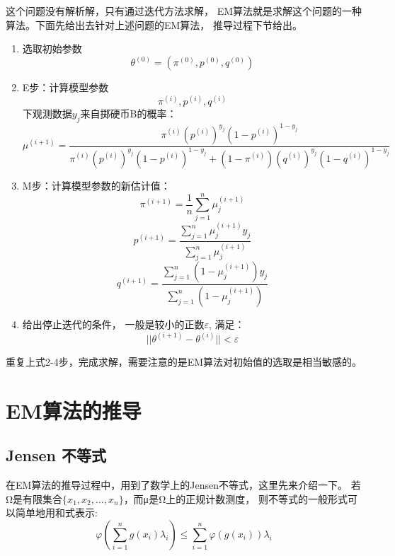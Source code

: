 \documentclass[a4paper,12pt]{book}
\begin{document}
    这个问题没有解析解，只有通过迭代方法求解，
    EM算法就是求解这个问题的一种算法。下面先给出去针对上述问题的EM算法，
    推导过程下节给出。
    \begin{enumerate}
        \item 选取初始参数 
        \begin{equation}
            \theta^{(0)} = (\pi^{(0)}, p^{(0)}, q^{(0)})
        \end{equation}
        \item E步：计算模型参数
        \begin{equation}
            \pi^{(i)}, p^{(i)}, q^{(i)}
        \end{equation}
        下观测数据$y_j$来自掷硬币B的概率：
        \begin{equation}
            \mu^{(i+1)} = \frac{\pi^{(i)}(p^{(i)})^{y_j}(1-p^{(i)})^{1-y_j}}{\pi^{(i)}(p^{(i)})^{y_j}(1-p^{(i)})^{1-y_j} +(1-\pi^{(i)})(q^{(i)})^{y_j}(1-q^{(i)})^{1-y_j}}
        \end{equation}
        \item M步：计算模型参数的新估计值：
        \begin{equation}
            \pi^{(i+1)} = \frac{1}{n}\sum_{j=1}^{n}\mu_j^{(i+1)}
        \end{equation}
        \begin{equation}
            p^{(i+1)} = \frac{\sum_{j=1}^{n}\mu_j^{(i+1)}y_j}{\sum_{j=1}^{n}\mu_j^{(i+1)}}
        \end{equation}
        \begin{equation}
            q^{(i+1)} = \frac{\sum_{j=1}^{n}(1-\mu_j^{(i+1)})y_j}{\sum_{j=1}^{n}(1-\mu_j^{(i+1)})}
        \end{equation}
        \item 给出停止迭代的条件， 一般是较小的正数$\varepsilon$, 满足：
        \begin{equation}
            ||\theta^{(i+1)}-\theta^{(i)}|| < \varepsilon
        \end{equation}
    \end{enumerate}
    重复上式2-4步，完成求解，需要注意的是EM算法对初始值的选取是相当敏感的。

    \section{EM算法的推导}
    \subsection{Jensen 不等式}
    在EM算法的推导过程中，用到了数学上的Jensen不等式，这里先来介绍一下。
    若Ω是有限集合$\{x_1,x_2,\ldots,x_n\}$，而μ是Ω上的正规计数测度，
    则不等式的一般形式可以简单地用和式表示:
    \begin{equation}
        \varphi\left(\sum_{i=1}^{n} g(x_i)\lambda_i \right) \le \sum_{i=1}^{n} \varphi(g(x_i))\lambda_i
    \end{equation}
\end{document}
